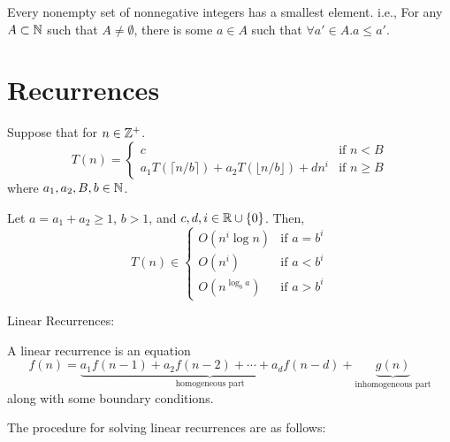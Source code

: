 \vspace{\parskip}

\begin{axiom_appendix}
Every nonempty set of nonnegative integers has a smallest element. i.e., For any $A \subset \mathbb{N}$ such that $A \neq \emptyset$, there is some $a \in A$ such that $\forall a' \in A.a\leq a'$.
\end{axiom_appendix}

\section*{Recurrences}

\vspace{\parskip}

\begin{theorem_appendix}
Suppose that for $n \in \mathbb{Z}^+$.
\begin{equation*}
    T(n) =
    \begin{cases}
    c & \text{if $n<B$} \\
    a_1 T(\lceil n/b \rceil) + a_2 T(\lfloor n/b \rfloor) + dn^i & \text{if $n\geq B$}
    \end{cases}
\end{equation*}
where $a_1, a_2, B, b \in \mathbb{N}$.

Let $a = a_1+a_2 \geq 1$, $b>1$, and $c,d,i \in \mathbb{R} \cup \{0\}$. Then,
\begin{equation*}
    T(n) \in
    \begin{cases}
    O(n^i \log n) & \text{if $a=b^i$} \\
    O(n^i) & \text{if $a < b^i$} \\
    O(n^{\log_b a}) & \text{if $a > b^i$}
    \end{cases}
\end{equation*}
\end{theorem_appendix}

Linear Recurrences:

A linear recurrence is an equation
$$
f(n) = \underbrace{a_1 f(n-1) + a_2 f(n-2) + \cdots + a_d f(n-d)}_{\text{homogeneous part}}  + \underbrace{g(n)}_{\text{inhomogeneous part}}
$$
along with some boundary conditions.

The procedure for solving linear recurrences are as follows:

